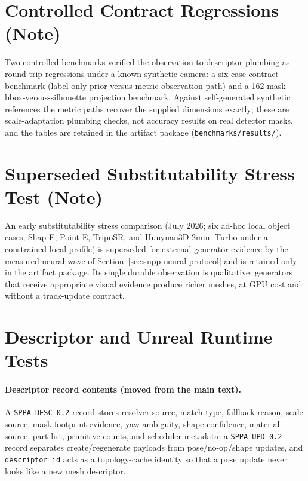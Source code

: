 \documentclass[10pt]{article}
\begin{document}
\section{Controlled Contract Regressions (Note)}
\label{sec:supp-contract-regressions}

Two controlled benchmarks verified the observation-to-descriptor plumbing as
round-trip regressions under a known synthetic camera: a six-case contract
benchmark (label-only prior versus metric-observation path) and a 162-mask
bbox-versus-silhouette projection benchmark. Against self-generated synthetic
references the metric paths recover the supplied dimensions exactly; these are
scale-adaptation plumbing checks, not accuracy results on real detector masks,
and the tables are retained in the artifact package
(\texttt{benchmarks/results/}).


\section{Superseded Substitutability Stress Test (Note)}
\label{sec:supp-stress}

An early substitutability stress comparison (July 2026; six ad-hoc local
object cases; Shap-E, Point-E, TripoSR, and Hunyuan3D-2mini Turbo under a
constrained local profile) is superseded for external-generator evidence by
the measured neural wave of Section~\ref{sec:supp-neural-protocol} and is
retained only in the artifact package. Its single durable observation is
qualitative: generators that receive appropriate visual evidence produce
richer meshes, at GPU cost and without a track-update contract.


\section{Descriptor and Unreal Runtime Tests}
\label{sec:supp-unreal}

\paragraph{Descriptor record contents (moved from the main text).}
A \texttt{SPPA-DESC-0.2} record stores resolver source, match type, fallback
reason, scale source, mask footprint evidence, yaw ambiguity, shape confidence,
material source, part list, primitive counts, and scheduler metadata; a
\texttt{SPPA-UPD-0.2} record separates create/regenerate payloads from
pose/no-op/shape updates, and \texttt{descriptor\_id} acts as a topology-cache
identity so that a pose update never looks like a new mesh descriptor.
\end{document}
